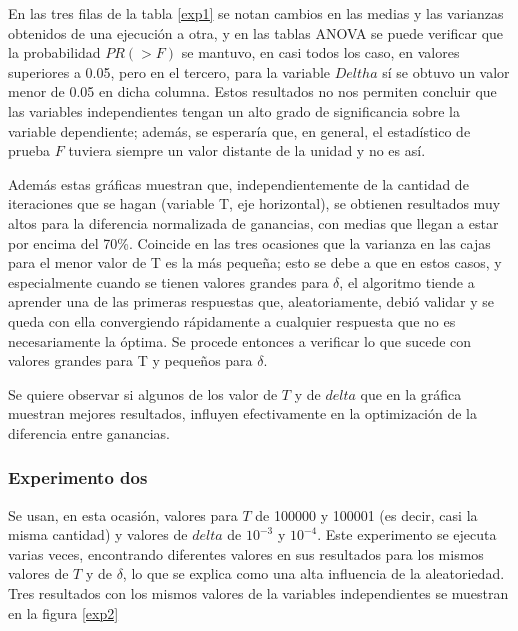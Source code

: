 En las tres filas de la tabla \ref{exp1} se notan cambios en las medias y las varianzas obtenidos de una ejecución a otra, y en las tablas ANOVA se puede verificar que la probabilidad $PR(>F)$ se mantuvo, en casi todos los caso, en valores superiores a 0.05, pero en el tercero, para la variable $Deltha$ sí se obtuvo un valor menor de 0.05 en dicha columna. Estos resultados no nos permiten concluir que las variables independientes tengan un alto grado de significancia sobre la variable dependiente; además, se esperaría que, en general, el estadístico de prueba $F$ tuviera siempre un valor distante de la unidad y no es así. 

Además estas gráficas muestran que, independientemente de la cantidad de iteraciones que se hagan (variable T, eje horizontal), se obtienen resultados muy altos para la diferencia normalizada de ganancias, con medias que llegan a estar por encima del 70\%. Coincide en las tres ocasiones que la varianza en las cajas para el menor valor de T es la más pequeña; esto se debe a que en estos casos, y especialmente cuando se tienen valores grandes para $\delta$, el algoritmo tiende a aprender una de las primeras respuestas que, aleatoriamente, debió validar y se queda con ella convergiendo rápidamente a cualquier respuesta que no es necesariamente la óptima. Se procede entonces a verificar lo que sucede con valores grandes para T y pequeños para $\delta$.

Se quiere observar si algunos de los valor de $T$ y de $delta$ que en la gráfica muestran mejores resultados, influyen efectivamente en la optimización de la diferencia entre ganancias.

\subsubsection{Experimento dos}


Se usan, en esta ocasión, valores para $T$ de 100000 y 100001 (es decir, casi la misma cantidad) y valores de $delta$ de $10^{-3}$ y $10^{-4}$. Este experimento se ejecuta varias veces, encontrando diferentes valores en sus resultados para los mismos valores de $T$ y de $\delta$, lo que se explica como una alta influencia de la aleatoriedad. Tres resultados con los mismos valores de la variables independientes se muestran en la figura \ref{exp2}

